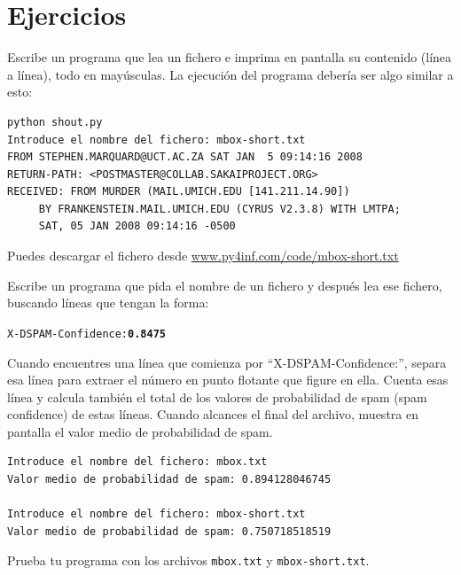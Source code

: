 \section{Ejercicios}

\begin{ex}
Escribe un programa que lea un fichero e imprima en pantalla su contenido
(línea a línea), todo en mayúsculas. La ejecución del programa debería
ser algo similar a esto:

\beforeverb
\begin{verbatim}
python shout.py
Introduce el nombre del fichero: mbox-short.txt
FROM STEPHEN.MARQUARD@UCT.AC.ZA SAT JAN  5 09:14:16 2008
RETURN-PATH: <POSTMASTER@COLLAB.SAKAIPROJECT.ORG>
RECEIVED: FROM MURDER (MAIL.UMICH.EDU [141.211.14.90])
	 BY FRANKENSTEIN.MAIL.UMICH.EDU (CYRUS V2.3.8) WITH LMTPA;
	 SAT, 05 JAN 2008 09:14:16 -0500
\end{verbatim}
\afterverb
%
Puedes descargar el fichero desde
\url{www.py4inf.com/code/mbox-short.txt}
\end{ex}

\begin{ex}
Escribe un programa
que pida el nombre de un fichero y después lea ese fichero,
buscando líneas que tengan la forma:

\beforeverb
\begin{alltt}
X-DSPAM-Confidence: {\bf 0.8475}
\end{alltt}
\afterverb

Cuando encuentres una línea que comienza por
``X-DSPAM-Confidence:'', separa esa línea para extraer
el número en punto flotante que figure en ella. Cuenta esas línea y
calcula también el total de los valores de probabilidad de spam (spam confidence)
de estas líneas. Cuando alcances el final del archivo, muestra en pantalla
el valor medio de probabilidad de spam.

\beforeverb
\begin{verbatim}
Introduce el nombre del fichero: mbox.txt
Valor medio de probabilidad de spam: 0.894128046745

Introduce el nombre del fichero: mbox-short.txt
Valor medio de probabilidad de spam: 0.750718518519
\end{verbatim}
\afterverb
%
Prueba tu programa con los archivos {\tt mbox.txt} y {\tt mbox-short.txt}.
\end{ex}


